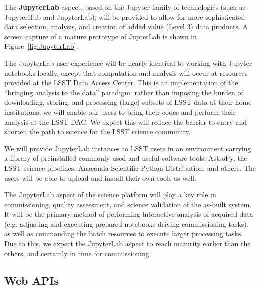 \documentclass[DM,lsstdraft,toc]{lsstdoc}
\begin{document}
The {\bf JupyterLab} aspect, based on the Jupyter family of technologies (such as
JupyterHub and JupyterLab), will be provided to allow for more sophisticated
data selection, analysis, and creation of added value (Level 3) data
products. A screen capture of a mature prototype of JupterLab is shown in 
Figure~\ref{fig:JupyterLab}.

The JupyterLab user experience will be nearly identical to working with
Jupyter notebooks locally, except that computation and analysis will occur
at resources provided at the LSST Data Access Center.  This is an
implementation of the “bringing analysis to the data” paradigm: rather
than imposing the burden of downloading, storing, and processing (large)
subsets of LSST data at their home institutions, we will enable our users to
bring their codes and perform their analysis at the LSST DAC.  We expect
this will reduce the barrier to entry and shorten the path to science for
the LSST science community.

We will provide JupyterLab instances to LSST users in an environment carrying a 
library of preinstalled commonly used and useful software tools:
AstroPy, the LSST science pipelines, Anaconda Scientific Python Distribution,
and others. The users will be able to upload and install their own tools as well.


The JupyterLab aspect of the science platform will play a key role in commissioning,
quality assessment, and science validation of the as-built system. It will be the primary
method of performing interactive analysis of acquired data (e.g. adjusting and executing
prepared notebooks driving commissioning tasks), as well as commanding
the batch resources to execute larger processing tasks. Due to this, we expect the
JupyterLab aspect to reach maturity earlier than the others, and certainly in time for
commissioning.


\subsection{Web APIs\label{sec:apis}}
\end{document}
